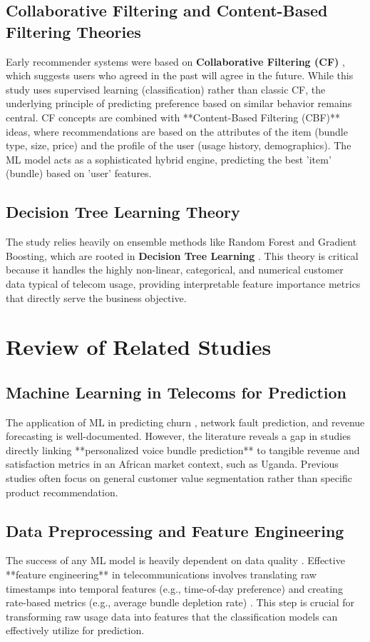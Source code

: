 \documentclass[12pt, a4paper]{report}
\begin{document}
\subsection{Collaborative Filtering and Content-Based Filtering Theories}
Early recommender systems were based on \textbf{Collaborative Filtering (CF)} \citep{sarwar2001itembased}, which suggests users who agreed in the past will agree in the future. While this study uses supervised learning (classification) rather than classic CF, the underlying principle of predicting preference based on similar behavior remains central. CF concepts are combined with **Content-Based Filtering (CBF)** ideas, where recommendations are based on the attributes of the item (bundle type, size, price) and the profile of the user (usage history, demographics). The ML model acts as a sophisticated hybrid engine, predicting the best 'item' (bundle) based on 'user' features.

\subsection{Decision Tree Learning Theory}
The study relies heavily on ensemble methods like Random Forest and Gradient Boosting, which are rooted in \textbf{Decision Tree Learning} \citep{quinlan1986induction}. This theory is critical because it handles the highly non-linear, categorical, and numerical customer data typical of telecom usage, providing interpretable feature importance metrics that directly serve the business objective.

\section{Review of Related Studies}

\subsection{Machine Learning in Telecoms for Prediction}
The application of ML in predicting churn \citep{bhatnagar2020predicting}, network fault prediction, and revenue forecasting is well-documented. However, the literature reveals a gap in studies directly linking **personalized voice bundle prediction** to tangible revenue and satisfaction metrics in an African market context, such as Uganda. Previous studies often focus on general customer value segmentation rather than specific product recommendation.

\subsection{Data Preprocessing and Feature Engineering}
The success of any ML model is heavily dependent on data quality \citep{tukey1977exploratory}. Effective **feature engineering** in telecommunications involves translating raw timestamps into temporal features (e.g., time-of-day preference) and creating rate-based metrics (e.g., average bundle depletion rate) \citep{shani2011evaluating}. This step is crucial for transforming raw usage data into features that the classification models can effectively utilize for prediction.
\end{document}
